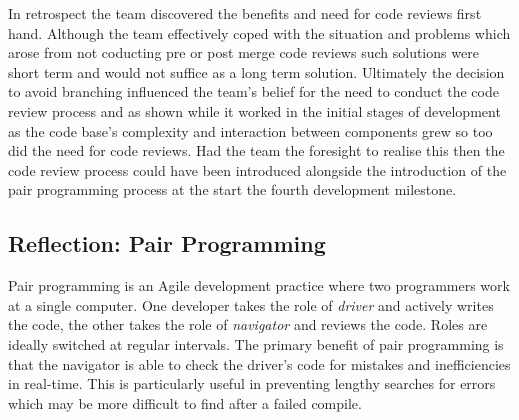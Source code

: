 \documentclass{l3proj}
\begin{document}
In retrospect the team discovered the benefits and need for code reviews first hand. Although the team effectively coped with the situation and problems which arose from not coducting pre or post merge code reviews such solutions were short term and would not suffice as a long term solution. Ultimately the decision to avoid branching influenced the team's belief for the need to conduct the code review process and as shown while it worked in the initial stages of development as the code base's complexity and interaction between components grew so too did the need for code reviews. Had the team the foresight to realise this then the code review process could have been introduced alongside the introduction of the pair programming process at the start the fourth development milestone.   


\subsection{Reflection: Pair Programming}
\label{sec:pairprogramming}


Pair programming is an Agile development practice where two programmers work at a single computer. One developer takes the role of \textit{driver} and actively writes the code, the other takes the role of \textit{navigator} and reviews the code. Roles are ideally switched at regular intervals. The primary benefit of pair programming is that the navigator is able to check the driver’s code for mistakes and inefficiencies in real-time. This is particularly useful in preventing lengthy searches for errors which may be more difficult to find after a failed compile. 
\end{document}
